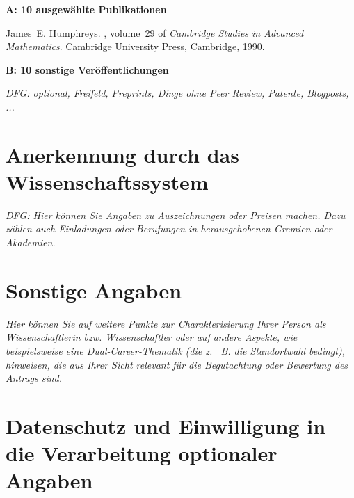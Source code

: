 \documentclass[11pt]{article}
\begin{document}
\textbf{A: 10 ausgewählte Publikationen}

\begin{thebibliography}{10}

James~E. Humphreys.
, volume~29 of {\em
  Cambridge Studies in Advanced Mathematics}.
\newblock Cambridge University Press, Cambridge, 1990.%

\end{thebibliography}

\printbibliography[heading=none]

\textbf{B: 10 sonstige Veröffentlichungen}

\emph{DFG: optional, Freifeld, Preprints, Dinge ohne Peer Review, Patente, Blogposts, ...}

\section*{Anerkennung durch das Wissenschaftssystem}

\emph{DFG: Hier können Sie Angaben zu Auszeichnungen oder Preisen
  machen. Dazu zählen auch Einladungen oder Berufungen in
  herausgehobenen Gremien oder Akademien.  }

\section*{Sonstige Angaben}

\emph{Hier können Sie auf weitere Punkte zur Charakterisierung Ihrer Person als Wissenschaftlerin bzw. Wissenschaftler oder auf andere Aspekte, wie beispielsweise eine Dual-Career-Thematik (die z.  B. die Standortwahl bedingt), hinweisen, die aus Ihrer Sicht relevant für die Begutachtung oder Bewertung des Antrags sind.}

\section*{Datenschutz und Einwilligung in die Verarbeitung optionaler Angaben}
\footnotesize
\end{document}
